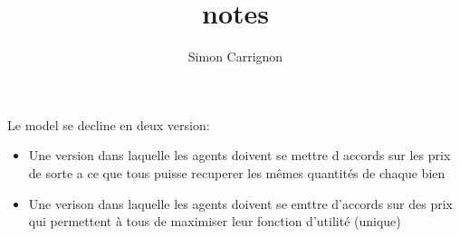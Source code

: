 \documentclass[a4paper]{article}
\title{notes}
\author{Simon Carrignon}
\begin{document}
Le model se decline en deux version:

\begin{itemize}
    \item Une version dans laquelle les agents doivent se mettre d accords sur les prix de sorte a ce que tous puisse recuperer les mêmes quantités de chaque bien
    \item Une verison dans laquelle  les agents doivent se emttre d'accords sur des prix qui permettent à tous de maximiser leur fonction d'utilité (unique)
\end{itemize}

\end{document}
